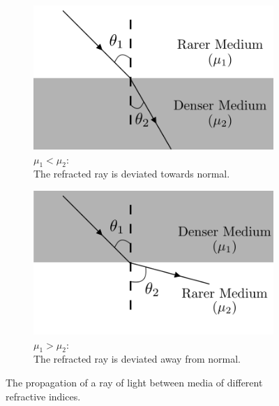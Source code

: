 \begin{figure}[!htb]
\captionsetup[subfigure]{justification=centering}
\centering
        \begin{subfigure}[b]{0.5\textwidth}
        \centering
                \includegraphics[scale=0.5]{figs/snell1.png}
                \caption{$\mu_1<\mu_2:$\\ The refracted ray is deviated towards normal.}
                \label{fig:rareToDense}
        \end{subfigure}\hfill
        \begin{subfigure}[b]{0.5\textwidth}
        \centering
                \includegraphics[scale=0.5]{figs/snell2.png}
                \caption{$\mu_1>\mu_2:$\\ The refracted ray is deviated away from normal.}
                \label{fig:denseToRare}
        \end{subfigure}
        \par\bigskip
        \caption{The propagation of a ray of light between media of different refractive indices.}\label{fig:snells}
\end{figure}


